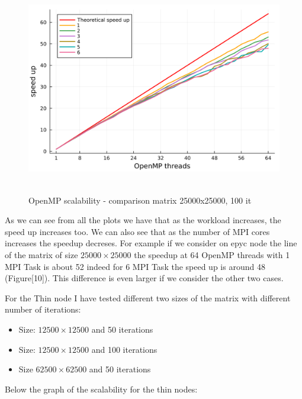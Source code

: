 \documentclass[
  letterpaper,
  DIV=11,
  numbers=noendperiod]{scrartcl}
\providecommand{\tightlist}{%
  \setlength{\itemsep}{0pt}\setlength{\parskip}{0pt}}\usepackage{longtable,booktabs,array}
\begin{document}
\begin{figure}

{\centering \includegraphics[width=\textwidth,height=3.64583in]{img/epyc_comparison.png}

}

\caption{OpenMP scalability - comparison matrix 25000x25000, 100 it}

\end{figure}

\newpage

As we can see from all the plots we have that as the workload increases,
the speed up increases too. We can also see that as the number of MPI
cores increases the speedup decreses. For example if we consider on epyc
node the line of the matrix of size \(25000\times 25000\) the speedup at
64 OpenMP threads with 1 MPI Task is about 52 indeed for 6 MPI Task the
speed up is around 48 (Figure{[}10{]}). This difference is even larger
if we consider the other two cases.

For the Thin node I have tested different two sizes of the matrix with
different number of iterations:

\begin{itemize}
\tightlist
\item
  Size: \(12500\times 12500\) and 50 iterations
\item
  Size: \(12500\times 12500\) and 100 iterations
\item
  Size \(62500\times 62500\) and 50 iterations
\end{itemize}

Below the graph of the scalability for the thin nodes:
\end{document}

